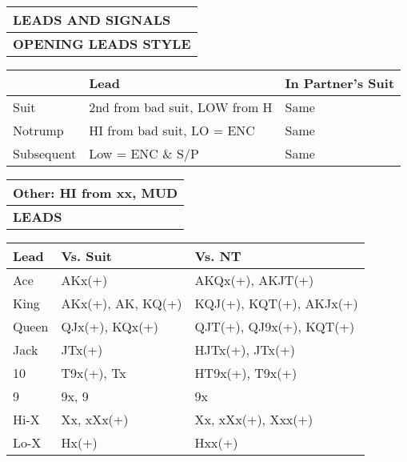 \documentclass{article}
\begin{document}
\begin{minipage}{90mm}
	\begin{tabular}{| p{88mm} |}
		\hline
		\cellcolor{green!25} \textbf{LEADS AND SIGNALS} \\ \hline
		\cellcolor{orange!25}\textbf{OPENING LEADS STYLE} \\ \hline
	\end{tabular}
	\begin{tabular}{| p{15.25mm} | p{32mm} | p{32mm} |}
		& Lead & In Partner's Suit \\ \hline
		Suit & 2nd from bad suit, LOW from H & Same \\ \hline
		Notrump & HI from bad suit, LO = ENC & Same \\ \hline
		Subsequent & Low = ENC \& S/P & Same \\ \hline
	\end{tabular}
	\begin{tabular}{| p{88mm} |}
		Other: HI from xx, MUD\\ \hline
		\cellcolor{orange!25}\textbf{LEADS} \\ \hline
	\end{tabular}
	\begin{tabular}{| p{15.25mm} | p{32mm} | p{32mm} |}
		Lead & Vs. Suit & Vs. NT \\ \hline
		Ace & AKx(+) & AKQx(+), AKJT(+)\\ \hline
		King & AKx(+), AK, KQ(+) & KQJ(+), KQT(+), AKJx(+)\\ \hline
		Queen & QJx(+), KQx(+) & QJT(+), QJ9x(+), KQT(+)\\ \hline
		Jack & JTx(+) & HJTx(+), JTx(+)\\ \hline
		10 & T9x(+), Tx & HT9x(+), T9x(+)\\ \hline
		9 & 9x, 9 & 9x \\ \hline
		Hi-X & Xx, xXx(+) & Xx, xXx(+), Xxx(+)\\ \hline
		Lo-X & Hx(+) & Hxx(+) \\ \hline
	\end{tabular}
	\begin{tabular}{| p{88mm} |}


\end{tabular}
\end{minipage}
\end{document}
